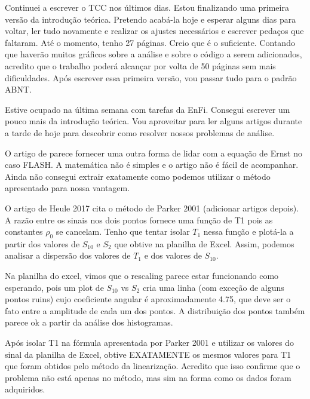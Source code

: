 \documentclass[idxtotoc,hyperref,openany]{labbook} %
\begin{document}


Continuei a escrever o TCC nos últimos dias. Estou finalizando uma primeira versão da introdução teórica. Pretendo acabá-la hoje e esperar alguns dias para voltar, ler tudo novamente e realizar os ajustes necessários e escrever pedaços que faltaram. Até o momento, tenho 27 páginas. Creio que é o suficiente. Contando que haverão muitos gráficos sobre a análise e sobre o código a serem adicionados, acredito que o trabalho poderá alcançar por volta de 50 páginas sem mais dificuldades. Após escrever essa primeira versão, vou passar tudo para o padrão ABNT.



Estive ocupado na última semana com tarefas da EnFi. Consegui escrever um pouco mais da introdução teórica. Vou aproveitar para ler alguns artigos durante a tarde de hoje para descobrir como resolver nossos problemas de análise.




O artigo de \citet{dathe2011} parece fornecer uma outra forma de lidar com a equação de Ernst no caso FLASH. A matemática não é simples e o artigo não é fácil de acompanhar. Ainda não consegui extrair exatamente como podemos utilizar o método apresentado para nossa vantagem.




O artigo de Heule 2017 cita o método de Parker 2001 (adicionar artigos depois). A razão entre os sinais nos dois pontos fornece uma função de T1 pois as constantes $\rho_0$ se cancelam. Tenho que tentar isolar $T_1$ nessa função e plotá-la a partir dos valores de $S_10$ e $S_2$ que obtive na planilha de Excel. Assim, podemos analisar a dispersão dos valores de $T_1$ e dos valores de $S_{10}$.


Na planilha do excel, vimos que o rescaling parece estar funcionando como esperando, pois um plot de $S_{10}$ vs $S_2$ cria uma linha (com exceção de alguns pontos ruins) cujo coeficiente angular é aproximadamente 4.75, que deve ser o fato entre a amplitude de cada um dos pontos. A distribuição dos pontos também parece ok a partir da análise dos histogramas.

Após isolar T1 na fórmula apresentada por Parker 2001 e utilizar os valores do sinal da planilha de Excel, obtive EXATAMENTE os mesmos valores para T1 que foram obtidos pelo método da linearização. Acredito que isso confirme que o problema não está apenas no método, mas sim na forma como os dados foram adquiridos.
\end{document}
